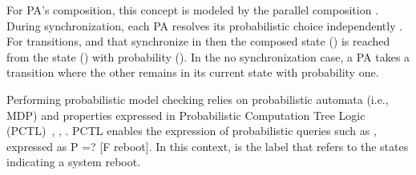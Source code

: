 For PA's composition, this concept is modeled by the parallel composition \cite{ref27}. During synchronization, each PA resolves its probabilistic choice independently \cite{ref27}. For transitions,   and  that synchronize in \emath{\alpha} then the composed state () is reached from the state () with probability ().  In the no synchronization case, a PA takes a transition where the other remains in its current state with probability one.


Performing probabilistic model checking relies on probabilistic automata (i.e., MDP) and properties expressed in Probabilistic Computation Tree Logic (PCTL)~\cite{hanssonlogic1994}, \cite{ref27}, \cite{goosit1995}. PCTL enables the expression of probabilistic queries such as , expressed as P =? [F reboot]. In this context,  is the label that refers to the states indicating a system reboot.


